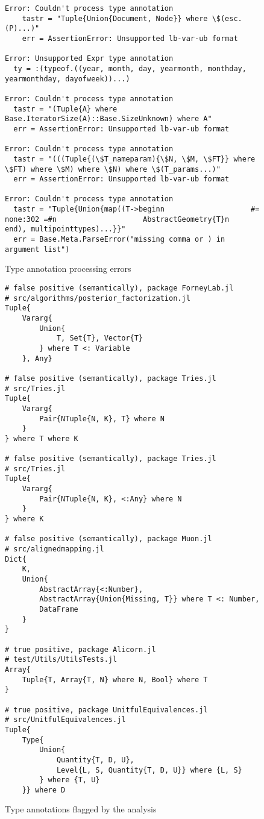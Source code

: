 \begin{figure}
\begin{lstlisting}
Error: Couldn't process type annotation
    tastr = "Tuple{Union{Document, Node}} where \$(esc.(P)...)"
    err = AssertionError: Unsupported lb-var-ub format
  
Error: Unsupported Expr type annotation
  ty = :(typeof.((year, month, day, yearmonth, monthday, yearmonthday, dayofweek))...)
  
Error: Couldn't process type annotation
  tastr = "(Tuple{A} where Base.IteratorSize(A)::Base.SizeUnknown) where A"
  err = AssertionError: Unsupported lb-var-ub format
  
Error: Couldn't process type annotation
  tastr = "(((Tuple{(\$T_nameparam){\$N, \$M, \$FT}} where \$FT) where \$M) where \$N) where \$(T_params...)"
  err = AssertionError: Unsupported lb-var-ub format

Error: Couldn't process type annotation
  tastr = "Tuple{Union{map((T->beginn                    #= none:302 =#n                    AbstractGeometry{T}n                end), multipointtypes)...}}"
  err = Base.Meta.ParseError("missing comma or ) in argument list")
\end{lstlisting}
\caption{Type annotation processing errors}\label{fig:evaluation-process-errors}
\end{figure}

\begin{figure}
\begin{minipage}{10cm}
\begin{lstlisting}
# false positive (semantically), package ForneyLab.jl
# src/algorithms/posterior_factorization.jl
Tuple{
    Vararg{
        Union{
            T, Set{T}, Vector{T}
        } where T <: Variable
    }, Any}

# false positive (semantically), package Tries.jl
# src/Tries.jl
Tuple{
    Vararg{
        Pair{NTuple{N, K}, T} where N
    }
} where T where K

# false positive (semantically), package Tries.jl
# src/Tries.jl
Tuple{
    Vararg{
        Pair{NTuple{N, K}, <:Any} where N
    }
} where K

# false positive (semantically), package Muon.jl
# src/alignedmapping.jl
Dict{
    K,
    Union{
        AbstractArray{<:Number}, 
        AbstractArray{Union{Missing, T}} where T <: Number, 
        DataFrame
    }
}

# true positive, package Alicorn.jl
# test/Utils/UtilsTests.jl 
Array{
    Tuple{T, Array{T, N} where N, Bool} where T
}

# true positive, package UnitfulEquivalences.jl
# src/UnitfulEquivalences.jl
Tuple{
    Type{
        Union{
            Quantity{T, D, U}, 
            Level{L, S, Quantity{T, D, U}} where {L, S}
        } where {T, U}
    }} where D
\end{lstlisting}
\end{minipage}
\caption{Type annotations flagged by the analysis}\label{fig:evaluation-unsup-ty-anns}
\end{figure}
